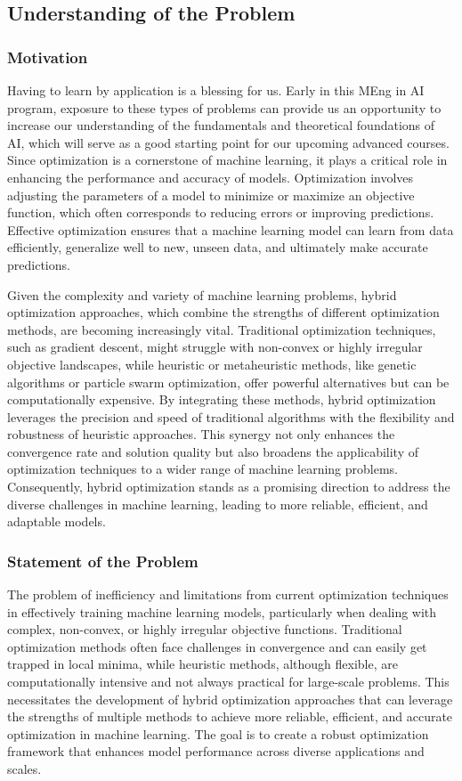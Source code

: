 \documentclass{article} %
\theoremstyle{definition}
\theoremstyle{remark}
\theoremstyle{plain}
\begin{document}
\subsection{Understanding of the Problem}
    \subsubsection{Motivation}
        Having to learn by application is a blessing for us. Early in this MEng in AI program, exposure to these types of problems can provide us an opportunity to increase our understanding of the fundamentals and theoretical foundations of AI, which will serve as a good starting point for our upcoming advanced courses. Since optimization is a cornerstone of machine learning, it plays a critical role in enhancing the performance and accuracy of models. Optimization involves adjusting the parameters of a model to minimize or maximize an objective function, which often corresponds to reducing errors or improving predictions. Effective optimization ensures that a machine learning model can learn from data efficiently, generalize well to new, unseen data, and ultimately make accurate predictions. 

        Given the complexity and variety of machine learning problems, hybrid optimization approaches, which combine the strengths of different optimization methods, are becoming increasingly vital. Traditional optimization techniques, such as gradient descent, might struggle with non-convex or highly irregular objective landscapes, while heuristic or metaheuristic methods, like genetic algorithms or particle swarm optimization, offer powerful alternatives but can be computationally expensive. By integrating these methods, hybrid optimization leverages the precision and speed of traditional algorithms with the flexibility and robustness of heuristic approaches. This synergy not only enhances the convergence rate and solution quality but also broadens the applicability of optimization techniques to a wider range of machine learning problems. Consequently, hybrid optimization stands as a promising direction to address the diverse challenges in machine learning, leading to more reliable, efficient, and adaptable models.

    \subsubsection{Statement of the Problem}
        The problem of inefficiency and limitations from current optimization techniques in effectively training machine learning models, particularly when dealing with complex, non-convex, or highly irregular objective functions. Traditional optimization methods often face challenges in convergence and can easily get trapped in local minima, while heuristic methods, although flexible, are computationally intensive and not always practical for large-scale problems. This necessitates the development of hybrid optimization approaches that can leverage the strengths of multiple methods to achieve more reliable, efficient, and accurate optimization in machine learning. The goal is to create a robust optimization framework that enhances model performance across diverse applications and scales.
\end{document}
